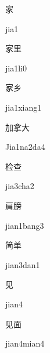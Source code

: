 \begin{multicols*}{2}
\begin{verbete}[jia1]{家}
\begin{pronuncia}{jia1}
\end{pronuncia}
\end{verbete}

\begin{verbete}[jia1li0]{家里}
\begin{pronuncia}{jia1li0}
\end{pronuncia}
\end{verbete}

\begin{verbete}{家乡}
\begin{pronuncia}{jia1xiang1}
\end{pronuncia}
\end{verbete}

\begin{verbete}[Jia1na2da4]{加拿大}
\begin{pronuncia}{Jia1na2da4}
\end{pronuncia}
\end{verbete}

\begin{verbete}{检查}
\begin{pronuncia}{jia3cha2}
\end{pronuncia}
\end{verbete}

\begin{verbete}{肩膀}
\begin{pronuncia}{jian1bang3}
\end{pronuncia}
\end{verbete}

\begin{verbete}{简单}
\begin{pronuncia}{jian3dan1}
\end{pronuncia}
\end{verbete}

\begin{verbete}[jian4]{见}
\begin{pronuncia}{jian4}
\end{pronuncia}
\end{verbete}

\begin{verbete}{见面}
\begin{pronuncia}{jian4mian4}
\end{pronuncia}
\end{verbete}


\end{multicols*}
